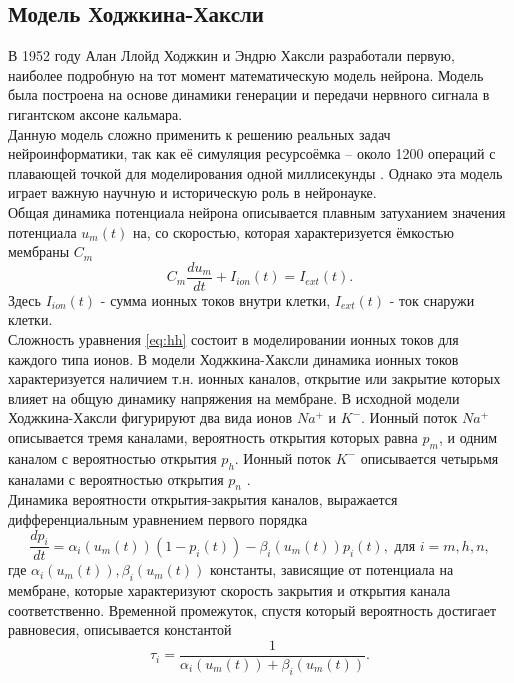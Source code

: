\documentclass[a4paper,10pt]{article}
\begin{document}
\subsection{Модель Ходжкина-Хаксли}
	В 1952 году Алан Ллойд Ходжкин и Эндрю Хаксли разработали первую, наиболее подробную на тот момент математическую модель нейрона. Модель была построена на основе динамики генерации и передачи нервного сигнала в гигантском аксоне кальмара.\\
	\indent Данную модель сложно применить к решению реальных задач нейроинформатики, так как её симуляция ресурсоёмка -- около 1200 операций с плавающей точкой для моделирования одной миллисекунды \cite{BohteReview}. Однако эта модель играет важную научную и историческую роль в нейронауке.\\
	\indent Общая динамика потенциала нейрона описывается плавным затуханием значения потенциала $u_{m}(t)$ на, со скоростью, которая характеризуется ёмкостью мембраны $C_{m}$
	\begin{equation}\label{eq:hh}
	C_{m}\frac{du_{m}}{dt}+I_{ion}(t)=I_{ext}(t).
	\end{equation}	 
	Здесь $I_{ion}(t)$ - сумма ионных токов внутри клетки, $I_{ext}(t)$ - ток снаружи клетки.\\
	\indent Сложность уравнения \eqref{eq:hh} состоит в моделировании ионных токов для каждого типа ионов. В модели Ходжкина-Хаксли динамика ионных токов характеризуется наличием т.н. ионных каналов, открытие или закрытие которых влияет на общую динамику напряжения на мембране. В исходной модели Ходжкина-Хаксли фигурируют два вида ионов $Na^{+}$ и $K^{-}$. Ионный поток $Na^{+}$ описывается тремя каналами, вероятность открытия которых равна $p_{m}$, и одним каналом с вероятностью открытия $p_{h}$. Ионный поток $K^{-}$ описывается четырьмя каналами с вероятностью открытия $p_{n}$ \cite{Genesis}.\\ 
	\indent Динамика вероятности открытия-закрытия каналов, выражается дифференциальным уравнением первого порядка
	\begin{equation}\label{eq:hh_pch}
	\frac{dp_{i}}{dt} = \alpha_{i}(u_{m}(t))(1-p_{i}(t)) - \beta_{i}(u_{m}(t))p_{i}(t), \mbox{ для } i = m, h, n,
	\end{equation}	 
	где $\alpha_{i}(u_{m}(t)), \beta_{i}(u_{m}(t))$ константы, зависящие от потенциала на мембране, которые характеризуют скорость закрытия и открытия канала соответственно. Временной промежуток, спустя который вероятность достигает равновесия, описывается константой
	\begin{equation}\label{eq:hh_t}
	\tau_{i}=\frac{1}{\alpha_{i}(u_{m}(t))+\beta_{i}(u_{m}(t))}.	
	\end{equation}
\end{document}
